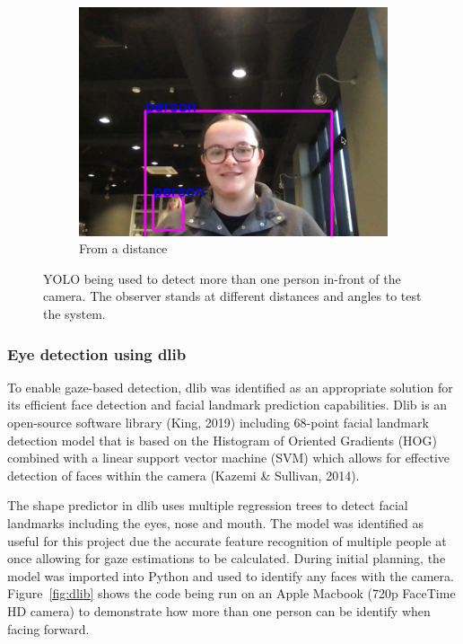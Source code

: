 \documentclass[12pt]{article}
\theoremstyle{plain}
\theoremstyle{definition}
\begin{document}
\begin{figure}
\begin{subfigure}[b]{0.3\textwidth}
         \includegraphics[width=\textwidth]{img/fig1-img3.png}
         \caption{From a distance}
         \label{fig:c}
     \end{subfigure}
        \caption{YOLO being used to detect more than one person in-front of the camera. The observer stands at different distances and angles to test the system.}
        \label{fig:yolo}
\end{figure}



\subsubsection{Eye detection using dlib}
To enable gaze-based detection, dlib was identified as an appropriate solution for its efficient face detection and facial landmark prediction capabilities. Dlib is an open-source software library (King, 2019) including 68-point facial landmark detection model that is based on the Histogram of Oriented Gradients (HOG) combined with a linear support vector machine (SVM) which allows for effective detection of faces within the camera (Kazemi & Sullivan, 2014).

The shape predictor in dlib uses multiple regression trees to detect facial landmarks including the eyes, nose and mouth. The model was identified as useful for this project due the accurate feature recognition of multiple people at once allowing for gaze estimations to be calculated.
During initial planning, the model was imported into Python and used to identify any faces with the camera. Figure~\ref{fig:dlib} shows the code being run on an Apple Macbook (720p FaceTime HD camera) to demonstrate how more than one person can be identify when facing forward.
\end{document}
